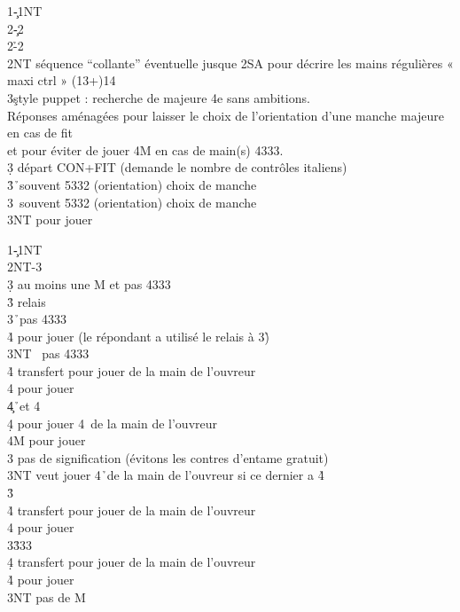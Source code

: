 \documentclass[a4paper]{article}
\begin{document}
\begin{bidtable}
1\c-1NT\\
2\c-2\d\\
2\h-2\s\\
2NT \> séquence ``collante'' éventuelle jusque 2SA pour décrire les mains régulières « maxi ctrl » (13+)14\+\\
3\c	style \> puppet : recherche de majeure 4e sans ambitions.\+\\
Réponses \> aménagées pour laisser le choix de l’orientation d’une manche majeure en cas de fit\\
et \> pour éviter de jouer 4M en cas de main(s) 4333.\-\\
3\d \> départ CON+FIT (demande le nombre de contrôles italiens)\\
3\h {}\h\ souvent 5332 (orientation) choix de manche\\
3\s {}\s\ souvent 5332 (orientation) choix de manche\\
3NT \> pour jouer\-
\end{bidtable}

\begin{bidtable}
1\c-1NT\\
2NT-3\c\\
3\d \> au moins une M et pas 4333\+\\
3\h \> relais\+\\
3\s {}\h\ pas 4333\+\\
4\h \> pour jouer (le répondant a utilisé le relais à 3\h )\-\\
3NT \s\ pas 4333\+\\
4\h \> transfert pour jouer de la main de l’ouvreur\\
4\s \> pour jouer\-\\
4\c {}\h\ et 4\s \+\\
4\d \> pour jouer 4\s\ de la main de l’ouvreur\\
4M \> pour jouer\-\-\\
3\s \> pas de signification (évitons les contres d’entame gratuit)\\
3NT \> veut jouer 4\h\ de la main de l'ouvreur si ce dernier a 4\h \-\\
3\h {}\+\\
4\h \> transfert pour jouer de la main de l’ouvreur\\
4\s \> pour jouer\-\\
3\s {}\h 333\+\\
4\d \> transfert pour jouer de la main de l’ouvreur\\
4\h \> pour jouer\-\\
3NT \> pas de M
\end{bidtable}
\end{document}
